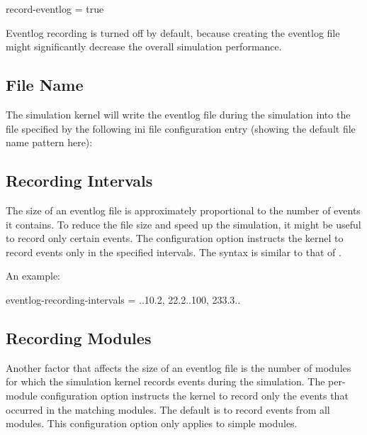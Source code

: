 \begin{inifile}
record-eventlog = true
\end{inifile}

\begin{note}
    Eventlog recording is turned off by default, because creating the eventlog file
    might significantly decrease the overall simulation performance.
\end{note}

\subsection{File Name}

The simulation kernel will write the eventlog file during the simulation into the file
specified by the following ini file configuration entry (showing the default file name
pattern here):


\subsection{Recording Intervals}

The size of an eventlog file is approximately proportional to the number of
events it contains. To reduce the file size and speed up the simulation, it
might be useful to record only certain events. The
 configuration option instructs the
kernel to record events only in the specified intervals. The syntax is
similar to that of .

An example:

\begin{inifile}
eventlog-recording-intervals = ..10.2, 22.2..100, 233.3..
\end{inifile}

\subsection{Recording Modules}

Another factor that affects the size of an eventlog file is the number of
modules for which the simulation kernel records events during the
simulation. The  per-module configuration
option instructs the kernel to record only the events that occurred in the
matching modules. The default is to record events from all modules. This
configuration option only applies to simple modules.

